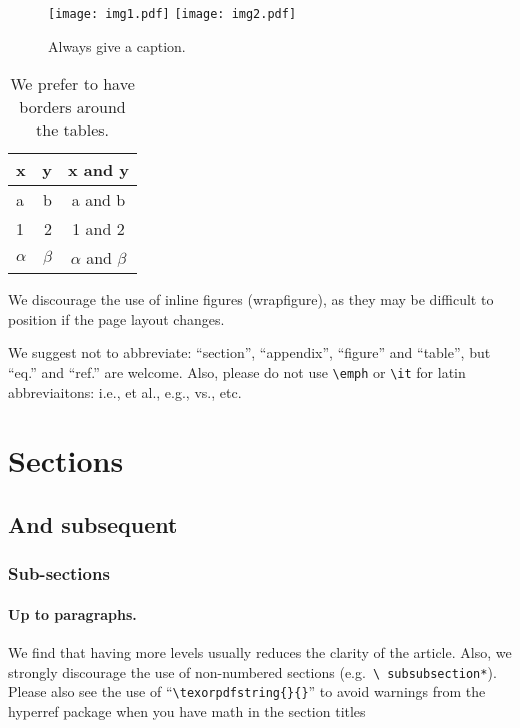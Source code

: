 \documentclass[letterpaper,12pt]{article}
\begin{document}
\begin{figure}[tbp]
\centering %
\texttt{[image: img1.pdf]}
\hfill
\texttt{[image: img2.pdf]}
\caption{\label{fig:i} Always give a caption.}
\end{figure}

\begin{table}[tbp]
\centering
\begin{tabular}{|lr|c|}
\hline
x&y&x and y\\
\hline
a & b & a and b\\
1 & 2 & 1 and 2\\
$\alpha$ & $\beta$ & $\alpha$ and $\beta$\\
\hline
\end{tabular}
\caption{\label{tab:i} We prefer to have borders around the tables.}
\end{table}

We discourage the use of inline figures (wrapfigure), as they may be
difficult to position if the page layout changes.

We suggest not to abbreviate: ``section'', ``appendix'', ``figure''
and ``table'', but ``eq.'' and ``ref.'' are welcome. Also, please do
not use \texttt{\textbackslash emph} or \texttt{\textbackslash it} for
latin abbreviaitons: i.e., et al., e.g., vs., etc.



\section{Sections}
\subsection{And subsequent}
\subsubsection{Sub-sections}
\paragraph{Up to paragraphs.} We find that having more levels usually
reduces the clarity of the article. Also, we strongly discourage the
use of non-numbered sections (e.g.~\texttt{\textbackslash
  subsubsection*}).  Please also see the use of
``\texttt{\textbackslash texorpdfstring\{\}\{\}}'' to avoid warnings
from the hyperref package when you have math in the section titles
\end{document}
